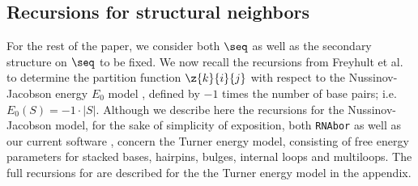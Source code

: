 \subsection*{Recursions for structural neighbors}

For the rest of the paper, we consider both $\seq$ as well as the
secondary structure \strSt on $\seq$ to be fixed. We now recall the
recursions from Freyhult et al. \cite{Freyhult.ab05} to determine
the partition function $\z{k}{i}{j}$ with
respect to the Nussinov-Jacobson
energy $E_0$ model \cite{nussinovJacobson}, defined by
$-1$ times the number of base pairs; i.e. $E_0(S) = -1 \cdot |S|$.
Although we describe here the recursions for the Nussinov-Jacobson
model, for the sake of
simplicity of exposition, both {\tt RNAbor}
\cite{Freyhult.ab05} as well as our current software \fftbor,
concern the Turner energy model, consisting of free energy parameters for
stacked bases, hairpins, bulges, internal loops and multiloops. The full
recursions for \fftbor are described for the
the Turner energy model in the appendix.

